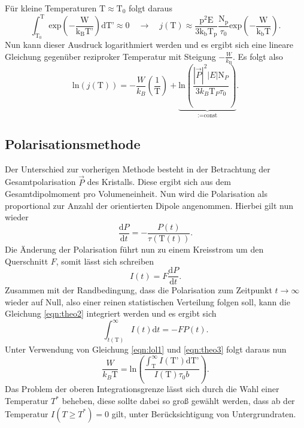 Für kleine Temperaturen $\text{T} \approx \text{T}_0$ folgt daraus
\begin{equation}
    \label{eqn:theo5}
    \int^{\text{T}}_{\text{T}_0}  \text{exp} \left( - \frac{\text{W}}{\text{k}_{\text{B}}\text{T'}} \right) \text{dT'} \approx 0 \quad \to \quad j \left( \text{T} \right) \approx \frac{\text{p}^2 \text{E}}{3\text{k}_{\text{b}}\text{T}_{\text{p}}} \frac{\text{N}_{\text{p}}}{\tau_0} \text{exp} \left(-\frac{\text{W}}{\text{k}_{\text{b}}\text{T}} \right).
\end{equation}
Nun kann dieser Ausdruck logarithmiert werden und es ergibt sich eine lineare Gleichung gegenüber reziproker Temperatur mit Steigung $-\frac{W}{k_{\text{B}}}$. Es folgt also
\begin{equation}
    \label{eqn:theo6}
\text{ln}(j(\text{T})) = - \frac{W}{k_{B}} \left( \frac{1}{\text{T}}\right) + \underbrace{\text{ln}\left( \frac{|\vec{P}|^2 |E| \text{N}_P}{3 k_B \text{T}_P \tau_0}\right)}_{:= \text{const}}.
\end{equation}

\subsection{Polarisationsmethode}
\label{sec:pola}
Der Unterschied zur vorherigen Methode besteht in der Betrachtung der Gesamtpolarisation $\vec{P}$ des Kristalls. Diese ergibt sich aus dem Gesamtdipolmoment pro Volumeneinheit. Nun wird die Polarisation als 
proportional zur Anzahl der orientierten Dipole angenommen. Hierbei gilt nun wieder
\begin{equation}
    \label{eqn:theo3}
\frac{\text{d}P}{\text{d}t} = - \frac{P(t)}{\tau(\text{T}(t))}.
\end{equation}
Die Änderung der Polarisation führt nun zu einem Kreisstrom um den Querschnitt $F$, somit lässt sich schreiben
\begin{equation}
    \label{eqn:theo2}
I(t) = F \frac{\text{d}P}{\text{d}t}.
\end{equation}
Zusammen mit der Randbedingung, dass die Polarisation zum Zeitpunkt $t \to \infty$ wieder auf Null, also einer reinen statistischen Verteilung folgen soll, kann die Gleichung 
\eqref{eqn:theo2} integriert werden und es ergibt sich
\begin{equation}
\int_{t(\text{T})}^{\infty} I(t) \text{d}t = - F P(t).
\end{equation}
Unter Verwendung von Gleichung \eqref{eqn:lol1} und \eqref{eqn:theo3} folgt daraus nun
\begin{equation}
    \label{eqn:idkwhat}
\frac{W}{k_B \text{T}} = \text{ln} \left( \frac{\int_{\text{T}}^{\infty} I(\text{T'}) \text{dT'} }{I(\text{T}) \tau_0 b}\right).
\end{equation}
Das Problem der oberen Integrationsgrenze lässt sich durch die Wahl einer Temperatur $T^*$ beheben, diese sollte dabei so groß gewählt werden, dass ab der Temperatur $I(T \geq T^*) = 0$ gilt, unter 
Berücksichtigung von Untergrundraten.

